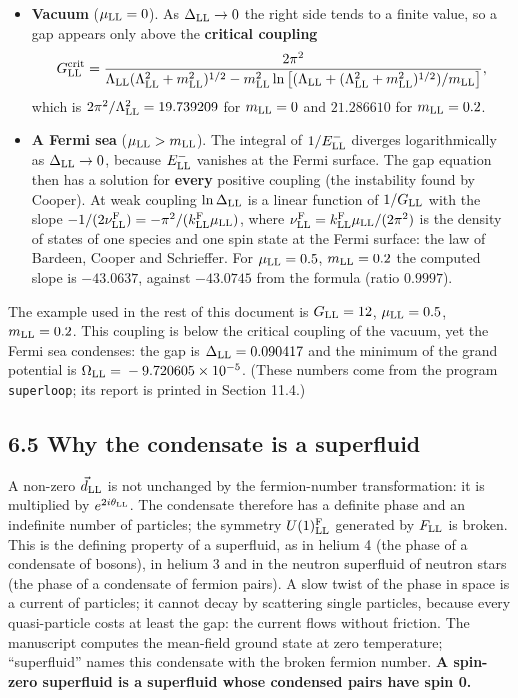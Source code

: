 \documentclass[
  10pt,
]{article}
\providecommand{\tightlist}{%
  \setlength{\itemsep}{0pt}\setlength{\parskip}{0pt}}
\begin{document}
\begin{itemize}
\tightlist
\item
  \textbf{Vacuum} (\(\mu_{\rm LL}=0\)). As \(\Delta_{\rm LL}\to0\) the
  right side tends to a finite value, so a gap appears only above the
  \textbf{critical coupling}
  \[G^{\rm crit}_{\rm LL}=\frac{2\pi^2}{\Lambda_{\rm LL}(\Lambda_{\rm LL}^2+m_{\rm LL}^2)^{1/2}-m_{\rm LL}^2\ln\big[(\Lambda_{\rm LL}+(\Lambda_{\rm LL}^2+m_{\rm LL}^2)^{1/2})/m_{\rm LL}\big]},\]
  which is \(2\pi^2/\Lambda_{\rm LL}^2={}19.739209\) for
  \(m_{\rm LL}=0\) and \(21.286610\) for \(m_{\rm LL}=0.2\).
\item
  \textbf{A Fermi sea} (\(\mu_{\rm LL}>m_{\rm LL}\)). The integral of
  \(1/E^-_{\rm LL}\) diverges logarithmically as
  \(\Delta_{\rm LL}\to0\), because \(E^-_{\rm LL}\) vanishes at the
  Fermi surface. The gap equation then has a solution for \textbf{every}
  positive coupling (the instability found by Cooper). At weak coupling
  \(\ln\Delta_{\rm LL}\) is a linear function of \(1/G_{\rm LL}\) with
  the slope
  \(-1/(2\nu^{\rm F}_{\rm LL})=-\pi^2/(k^{\rm F}_{\rm LL}\mu_{\rm LL})\),
  where \(\nu^{\rm F}_{\rm LL}=k^{\rm F}_{\rm LL}\mu_{\rm LL}/(2\pi^2)\)
  is the density of states of one species and one spin state at the
  Fermi surface: the law of Bardeen, Cooper and Schrieffer. For
  \(\mu_{\rm LL}=0.5\), \(m_{\rm LL}=0.2\) the computed slope is
  \(-43.0637\), against \(-43.0745\) from the formula (ratio
  \(0.9997\)).
\end{itemize}

The example used in the rest of this document is \(G_{\rm LL}=12\),
\(\mu_{\rm LL}=0.5\), \(m_{\rm LL}=0.2\). This coupling is below the
critical coupling of the vacuum, yet the Fermi sea condenses: the gap is
\(\Delta_{\rm LL}={}0.090417\) and the minimum of the grand potential is
\(\Omega_{\rm LL}={}-9.720605\times10^{-5}\). (These numbers come from
the program \texttt{superloop}; its report is printed in Section 11.4.)

\hypertarget{why-the-condensate-is-a-superfluid}{%
\subsection{6.5 Why the condensate is a
superfluid}\label{why-the-condensate-is-a-superfluid}}

A non-zero \(\vec d_{\rm LL}\) is not unchanged by the fermion-number
transformation: it is multiplied by \(e^{2i\theta_{\rm LL}}\). The
condensate therefore has a definite phase and an indefinite number of
particles; the symmetry \(U(1)^{\rm F}_{\rm LL}\) generated by
\(F_{\rm LL}\) is broken. This is the defining property of a superfluid,
as in helium 4 (the phase of a condensate of bosons), in helium 3 and in
the neutron superfluid of neutron stars (the phase of a condensate of
fermion pairs). A slow twist of the phase in space is a current of
particles; it cannot decay by scattering single particles, because every
quasi-particle costs at least the gap: the current flows without
friction. The manuscript computes the mean-field ground state at zero
temperature; ``superfluid'' names this condensate with the broken
fermion number. \textbf{A spin-zero superfluid is a superfluid whose
condensed pairs have spin 0.}
\end{document}
